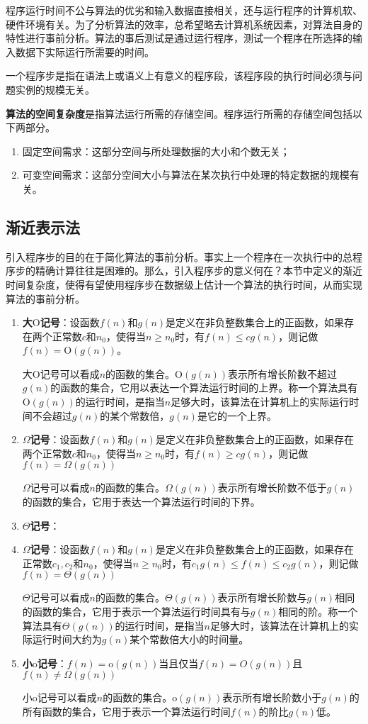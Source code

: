 程序运行时间不公与算法的优劣和输入数据直接相关，还与运行程序的计算机软、硬件环境有关。为了分析算法的效率，总希望略去计算机系统因素，对算法自身的特性进行事前分析。算法的事后测试是通过运行程序，测试一个程序在所选择的输入数据下实际运行所需要的时间。

一个程序步是指在语法上或语义上有意义的程序段，该程序段的执行时间必须与问题实例的规模无关。

\textbf{算法的空间复杂度}是指算法运行所需的存储空间。程序运行所需的存储空间包括以下两部分。
\begin{enumerate}
	\item 固定空间需求：这部分空间与所处理数据的大小和个数无关；
	\item 可变空间需求：这部分空间大小与算法在某次执行中处理的特定数据的规模有关。
\end{enumerate}
\subsection*{渐近表示法}
引入程序步的目的在于简化算法的事前分析。事实上一个程序在一次执行中的总程序步的精确计算往往是困难的。那么，引入程序步的意义何在？本节中定义的渐近时间复杂度，使得有望使用程序步在数据级上估计一个算法的执行时间，从而实现算法的事前分析。
\begin{enumerate}
	\item \textbf{大$\mathrm{O}$记号}：设函数$f(n)$和$g(n)$是定义在非负整数集合上的正函数，如果存在两个正常数$c$和$n_0$，使得当$n\geq n_0$时，有$f(n) \leq cg(n)$，则记做$f(n) = \mathrm{O}(g(n))$。
	
	大$\mathrm{O}$记号可以看成$n$的函数的集合。$\mathrm{O}(g(n))$表示所有增长阶数不超过$g(n)$的函数的集合，它用以表达一个算法运行时间的上界。称一个算法具有$\mathrm{O}(g(n))$的运行时间，是指当$n$足够大时，该算法在计算机上的实际运行时间不会超过$g(n)$的某个常数倍，$g(n)$是它的一个上界。
	\item \textbf{$\Omega$记号}：设函数$f(n)$和$g(n)$是定义在非负整数集合上的正函数，如果存在两个正常数$c$和$n_0$，使得当$n\geq n_0$时，有$f(n) \geq cg(n)$，则记做$f(n) = \Omega(g(n))$
	
	$\Omega$记号可以看成$n$的函数的集合。$\Omega(g(n))$表示所有增长阶数不低于$g(n)$的函数的集合，它用于表达一个算法运行时间的下界。
	\item \textbf{$\Theta$记号}：
	\item \textbf{$\Omega$记号}：设函数$f(n)$和$g(n)$是定义在非负整数集合上的正函数，如果存在正常数$c_1,c_2$和$n_0$，使得当$n\geq n_0$时，有$c_1g(n) \leq f(n) \leq c_2g(n)$，则记做$f(n) = \Theta(g(n))$
	
	$\Theta$记号可以看成$n$的函数的集合。$\Theta(g(n))$表示所有增长阶数与$g(n)$相同的函数的集合，它用于表示一个算法运行时间具有与$g(n)$相同的阶。称一个算法具有$\Theta(g(n))$的运行时间，是指当$n$足够大时，该算法在计算机上的实际运行时间大约为$g(n)$某个常数倍大小的时间量。
	\item \textbf{小$\mathrm{o}$记号}：$f(n) = \mathrm{o}(g(n))$当且仅当$f(n) = O(g(n))$且$f(n) \ne \Omega(g(n))$
	
	小$\mathrm{o}$记号可以看成$n$的函数的集合。$\mathrm{o}(g(n))$表示所有增长阶数小于$g(n)$的所有函数的集合，它用于表示一个算法运行时间$f(n)$的阶比$g(n)$低。
\end{enumerate}

